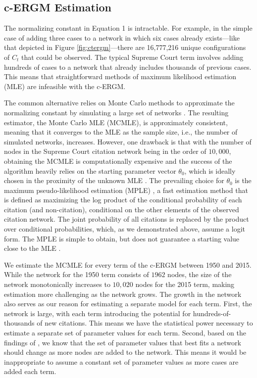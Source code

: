 \documentclass[headsepline=true, abstracton]{scrartcl}
\begin{document}
\subsection{c-ERGM Estimation}

The normalizing constant in Equation 1 is intractable. For example, in the simple case of adding three cases to a network in which six cases already exists---like that depicted in Figure \ref{fig:ctergm}---there are 16,777,216 unique configurations of $C_t$ that could be observed. The typical Supreme Court term involves adding hundreds of cases to a network that already includes thousands of previous cases. This means that straightforward methods of maximum likelihood estimation (MLE) are infeasible with the c-ERGM. 

The common alternative relies on Monte Carlo methods to approximate the normalizing constant by simulating a large set of networks \citep{hunter2006inference,hummel2012improving}. The resulting estimator, the Monte Carlo MLE (MCMLE), is approximately consistent, meaning that it converges to the MLE as the sample size, i.e., the number of simulated networks, increases. However, one drawback is that with the number of nodes in the Supreme Court citation network being in the order of $10,000$, obtaining the MCMLE is computationally expensive \citep{schmid2017exponential} and the success of the algorithm heavily relies on the starting parameter vector $\theta_0$, which is ideally chosen in the proximity of the unknown MLE \citep{hummel2012improving}. The prevailing choice for $\theta_0$ is the maximum pseudo-likelihood estimation (MPLE) \citep{strauss1990pseudolikelihood}, a fast estimation method that is defined as maximizing the log product of the conditional probability of each citation (and non-citation), conditional on the other elements of the observed citation network. The joint probability of all citations is replaced by the product over conditional probabilities, which, as we demonstrated above, assume a logit form. The MPLE is simple to obtain, but does not guarantee a starting value close to the MLE \citep{SchmidHunter2020}. 

We estimate the MCMLE for every term of the c-ERGM between 1950 and 2015. While the network for the 1950 term consists of $1962$ nodes, the size of the network monotonically increases to $10,020$ nodes for the 2015 term, making estimation more challenging as the network grows. The growth in the network also serves as our reason for estimating a separate model for each term. First, the network is large, with each term introducing the potential for hundreds-of-thousands of new citations. This means we have the statistical power necessary to estimate a separate set of parameter values for each term. Second, based on the findings of \citet{shalizi2013consistency}, we know that the set of parameter values that best fits a network should change as more nodes are added to the network. This means it would be inappropriate to assume a constant set of parameter values as more cases are added each term. 
\end{document}
